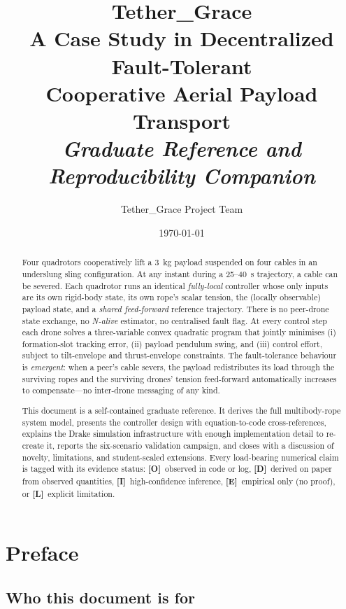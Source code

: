 \documentclass[11pt,a4paper,oneside]{report}
\title{%
  \huge\textbf{Tether\_Grace}\\[0.4em]
  \Large A Case Study in Decentralized Fault-Tolerant\\
  Cooperative Aerial Payload Transport \\[0.8em]
  \large\emph{Graduate Reference and Reproducibility Companion}
}
\author{Tether\_Grace Project Team}
\date{\today}
\newcommand{\Obs}{\textcolor{green!50!black}{\textbf{[O]}}}
\newcommand{\Der}{\textcolor{blue!60!black}{\textbf{[D]}}}
\newcommand{\Inf}{\textcolor{orange!70!black}{\textbf{[I]}}}
\newcommand{\Emp}{\textcolor{purple!60!black}{\textbf{[E]}}}
\newcommand{\Lim}{\textcolor{red!60!black}{\textbf{[L]}}}
\begin{document}
\maketitle

\thispagestyle{empty}
\begin{abstract}
Four quadrotors cooperatively lift a 3~kg payload suspended on four
cables in an underslung sling configuration. At any instant during a
25--40~s trajectory, a cable can be severed. Each quadrotor runs an
identical \emph{fully-local} controller whose only inputs are its own
rigid-body state, its own rope's scalar tension, the (locally
observable) payload state, and a \emph{shared feed-forward}
reference trajectory. There is no peer-drone state exchange, no
\emph{N-alive} estimator, no centralised fault flag. At every control
step each drone solves a three-variable convex quadratic program that
jointly minimises (i) formation-slot tracking error, (ii) payload
pendulum swing, and (iii) control effort, subject to tilt-envelope
and thrust-envelope constraints. The fault-tolerance behaviour is
\emph{emergent}: when a peer's cable severs, the payload redistributes
its load through the surviving ropes and the surviving drones'
tension feed-forward automatically increases to compensate---no
inter-drone messaging of any kind.

This document is a self-contained graduate reference. It derives the
full multibody-rope system model, presents the controller design
with equation-to-code cross-references, explains the Drake simulation
infrastructure with enough implementation detail to re-create it,
reports the six-scenario validation campaign, and closes with a
discussion of novelty, limitations, and student-scaled extensions.
Every load-bearing numerical claim is tagged with its evidence
status: \Obs~observed in code or log, \Der~derived on paper from
observed quantities, \Inf~high-confidence inference, \Emp~empirical
only (no proof), or \Lim~explicit limitation.
\end{abstract}

\tableofcontents
\clearpage

\chapter*{Preface}

\section*{Who this document is for}
\end{document}
